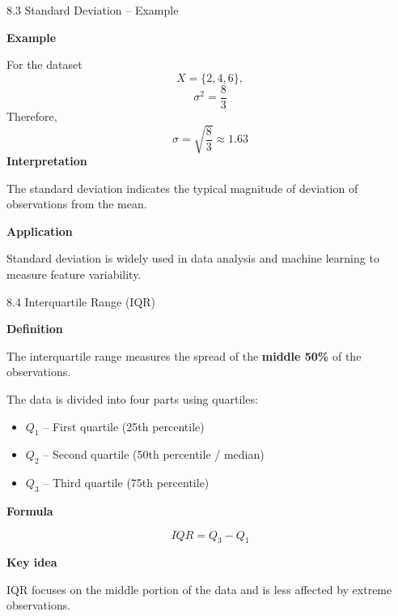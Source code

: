 
\begin{frame}{8.3 Standard Deviation -- Example}

\textbf{Example}

For the dataset
\[
X=\{2,4,6\},
\]
\[
\sigma^2=\frac{8}{3}
\]
Therefore,
\[
\sigma
=
\sqrt{\frac{8}{3}}
\approx
\boxed{1.63}
\]
\textbf{Interpretation}

The standard deviation indicates the typical magnitude of
deviation of observations from the mean.

\textbf{Application}

Standard deviation is widely used in data analysis and machine
learning to measure feature variability.

\end{frame}



\begin{frame}{8.4 Interquartile Range (IQR)}

\textbf{Definition}

The interquartile range measures the spread of the
\textbf{middle 50\%} of the observations.

\vspace{0.4cm}

The data is divided into four parts using quartiles:

\begin{itemize}
    \item $Q_1$ -- First quartile (25th percentile)
    \item $Q_2$ -- Second quartile (50th percentile / median)
    \item $Q_3$ -- Third quartile (75th percentile)
\end{itemize}

\vspace{0.3cm}

\textbf{Formula}

\[
\boxed{
IQR=Q_3-Q_1
}
\]

\vspace{0.3cm}

\textbf{Key idea}

IQR focuses on the middle portion of the data and is
less affected by extreme observations.

\end{frame}


